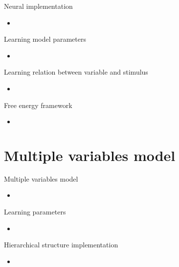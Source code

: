 \documentclass[aspectratio=43]{beamer}
\begin{document}
\begin{frame}{Neural implementation}
  \begin{itemize}
    \item %
  \end{itemize}
\end{frame}


\begin{frame}{Learning model parameters}
  \begin{itemize}
    \item %
  \end{itemize}
\end{frame}

\begin{frame}{Learning relation between variable and stimulus}
  \begin{itemize}
    \item %
  \end{itemize}
\end{frame}

\begin{frame}{Free energy framework}
  \begin{itemize}
    \item %
  \end{itemize}
\end{frame}



\section{Multiple variables model}
\begin{frame}{Multiple variables model}
  \begin{itemize}
    \item %
  \end{itemize}
\end{frame}

\begin{frame}{Learning parameters}
  \begin{itemize}
    \item %
  \end{itemize}
\end{frame}

\begin{frame}{Hierarchical structure implementation}
  \begin{itemize}
    \item %
  \end{itemize}
\end{frame}
\end{document}
